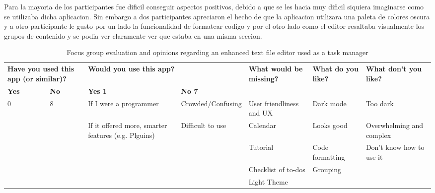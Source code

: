 Para la mayoria de los participantes fue dificil conseguir aspectos positivos, debido a que se les hacia muy dificil siquiera imaginarse como se utilizaba dicha aplicacion. Sin embargo a dos participantes apreciaron el hecho de que la aplicacion utilizara una paleta de colores oscura y a otro participante le gusto por un lado la funcionalidad de formatear codigo y por el otro lado como el editor resaltaba visualmente los grupos de contenido y se podia ver claramente ver que estaba en una misma seccion. 

\FloatBarrier
\begin{table}[!htbp]
    \centering
    \begin{adjustbox}{width=1.2\textwidth,center=\textwidth}
        \begin{tabular}{|l|l|l|l|l|l|l|}
        \hline
        \multicolumn{2}{|l}{\textbf{Have you used this app (or similar)?}} & \multicolumn{2}{|l|}{\textbf{Would you use this app?}} & \multirow{2}{*}{\textbf{What would be missing?}} & \multirow{2}{*}{\textbf{What do you like?}} & \multirow{2}{*}{\textbf{What don't you like?}} \\ \cline{1-4}
        \textbf{Yes} & \textbf{No} & \textbf{Yes   1} & \textbf{No   7} & & & \\
        \hline
        \multirow{6}{*}{ 0 } & \multirow{6}{*}{ 8 } & If I were a programmer & Crowded/Confusing & User friendliness and UX & Dark mode & Too dark \\ \cline{3-7}
        & & If it offered more, smarter features (e.g. Plguins) & Difficult to use & Calendar & Looks good & Overwhelming and complex \\ \cline{3-7}
        & & & & Tutorial & Code formatting & Don't know how to use it \\ \cline{3-7}
        & & & & Checklist of to-dos & Grouping & \\ \cline{3-7}
        & & & & Light Theme & & \\ \hline
        \end{tabular}
    \end{adjustbox}
    \caption{Focus group evaluation and opinions regarding an enhanced text file editor used as a task manager}
    \label{tab:enhancedTextFileEval}
\end{table}
\FloatBarrier

